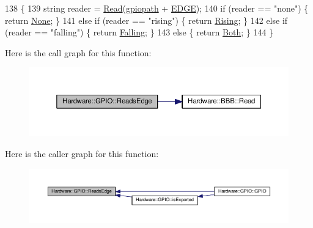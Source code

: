 \begin{DoxyCode}
138     \{
139         \textcolor{keywordtype}{string} reader = \hyperlink{class_hardware_1_1_b_b_b_a8b287ded7bcb2cfab361d1fca2b62e9f}{Read}(\hyperlink{class_hardware_1_1_g_p_i_o_ac47062ed6aba52b9e8506e1575bf5061}{gpiopath} + \hyperlink{_g_p_i_o_8h_ac243bfa96aa2c28014159ff098bd2324}{EDGE});
140         \textcolor{keywordflow}{if} (reader == \textcolor{stringliteral}{"none"}) \{ \textcolor{keywordflow}{return} \hyperlink{class_hardware_1_1_g_p_i_o_a9a7595aabdac9aec75f22e8b86342162aa49ebde2bcdeefb0e7be23fd0fbbdee6}{None}; \}
141         \textcolor{keywordflow}{else} \textcolor{keywordflow}{if} (reader == \textcolor{stringliteral}{"rising"}) \{ \textcolor{keywordflow}{return} \hyperlink{class_hardware_1_1_g_p_i_o_a9a7595aabdac9aec75f22e8b86342162afbb0aadc6c0311beb25d5a056c61ed46}{Rising}; \}
142         \textcolor{keywordflow}{else} \textcolor{keywordflow}{if} (reader == \textcolor{stringliteral}{"falling"}) \{ \textcolor{keywordflow}{return} \hyperlink{class_hardware_1_1_g_p_i_o_a9a7595aabdac9aec75f22e8b86342162a0db6d4392aec905f4fd0576c2cba9279}{Falling}; \}
143         \textcolor{keywordflow}{else} \{ \textcolor{keywordflow}{return} \hyperlink{class_hardware_1_1_g_p_i_o_a9a7595aabdac9aec75f22e8b86342162aa6f3d9102e894c4bf553a679ad2148c3}{Both}; \}
144     \}
\end{DoxyCode}


Here is the call graph for this function\+:\nopagebreak
\begin{figure}[H]
\begin{center}
\leavevmode
\includegraphics[width=350pt]{class_hardware_1_1_g_p_i_o_ac5a3c6d1a0ce58a0b2ee0752623810e4_cgraph}
\end{center}
\end{figure}




Here is the caller graph for this function\+:\nopagebreak
\begin{figure}[H]
\begin{center}
\leavevmode
\includegraphics[width=350pt]{class_hardware_1_1_g_p_i_o_ac5a3c6d1a0ce58a0b2ee0752623810e4_icgraph}
\end{center}
\end{figure}


